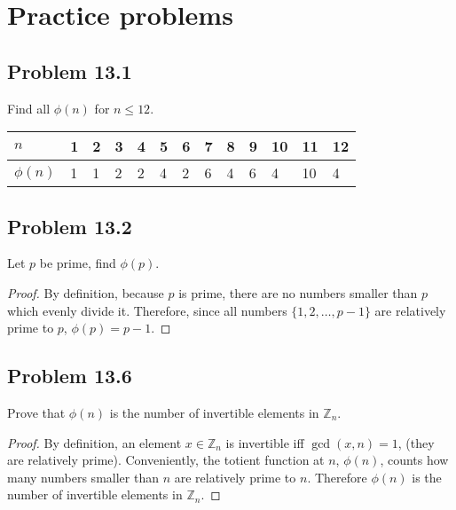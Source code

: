 \documentclass[12pt]{article}
\title{\scalebox{2}{Math 341 Homework 13}}
\author{\scalebox{1.5}{Theo Koss}}
\date{December 2020}
\newcommand{\Z}{\mathbb{Z}}
\begin{document}
\maketitle
\section{Practice problems}
\subsection{Problem 13.1}
Find all $\phi(n)$ for $n\leq12$.
\begin{table}[h]
\begin{tabular}{|l|l|l|l|l|l|l|l|l|l|l|l|l|}
\hline
$n$       & 1 & 2 & 3 & 4 & 5 & 6 & 7 & 8 & 9 & 10 & 11 & 12 \\ \hline
$\phi(n)$ & 1 & 1 & 2 & 2 & 4 & 2 & 6 & 4 & 6 & 4  & 10 & 4  \\ \hline
\end{tabular}
\end{table}
\subsection{Problem 13.2}
Let $p$ be prime, find $\phi(p)$.
\begin{proof}
By definition, because $p$ is prime, there are no numbers smaller than $p$ which evenly divide it. Therefore, since all numbers $\{1,2,\dots,p-1\}$ are relatively prime to $p$, $\phi(p)=p-1$.
\end{proof}
\subsection{Problem 13.6}
Prove that $\phi(n)$ is the number of invertible elements in $\Z_{n}$.
\begin{proof}
By definition, an element $x\in\Z_n$ is invertible iff $\gcd(x,n)=1$, (they are relatively prime). Conveniently, the totient function at $n$, $\phi(n)$, counts how many numbers smaller than $n$ are relatively prime to $n$. Therefore $\phi(n)$ is the number of invertible elements in $\Z_n$.
\end{proof}
\end{document}
